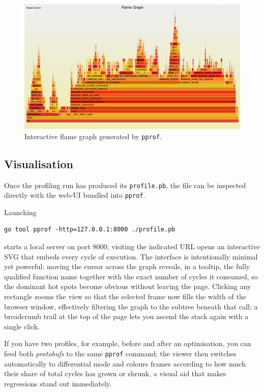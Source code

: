\begin{figure}[h]
  \centering
  \includegraphics[width=\linewidth]{Images/Chap4/cpu-bash-flamegraph.png}
  \caption{Interactive flame graph generated by \texttt{pprof}.}
  \label{fig:flamegraph_example}
\end{figure}
\subsection{Visualisation}  
Once the profiling run has produced its \texttt{profile.pb}, the file can be inspected directly with the web-UI bundled into \texttt{pprof}.  

Launching
\begin{verbatim}
go tool pprof -http=127.0.0.1:8000 ./profile.pb
\end{verbatim}
starts a local server on port 8000; visiting the indicated URL opens an interactive SVG that embeds every cycle of execution. The interface is intentionally minimal yet powerful: moving the cursor across the graph reveals, in a tooltip, the fully qualified function name together with the exact number of cycles it consumed, so the dominant hot spots become obvious without leaving the page. Clicking any rectangle zooms the view so that the selected frame now fills the width of the browser window, effectively filtering the graph to the subtree beneath that call; a breadcrumb trail at the top of the page lets you ascend the stack again with a single click.  

If you have two profiles, for example, before and after an optimisation, you can
feed both \emph{protobufs} to the same \texttt{pprof} command; the viewer then
switches automatically to differential mode and colours frames according to
how much their share of total cycles has grown or shrunk, a visual aid that
makes regressions stand out immediately.  

